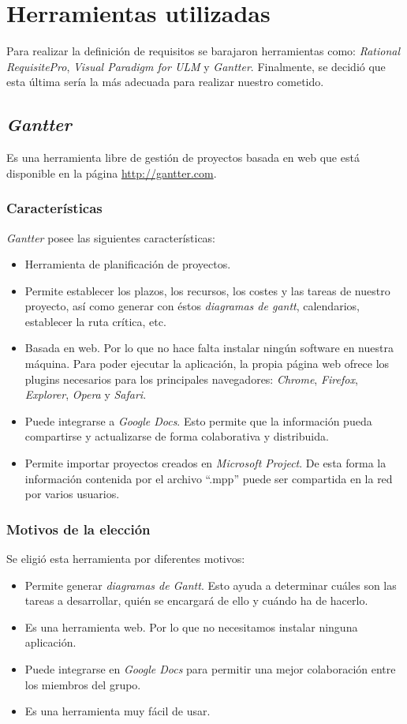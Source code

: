 \section{Herramientas utilizadas}
Para realizar la definición de requisitos se barajaron herramientas como:
\emph{Rational RequisitePro}, \emph{Visual Paradigm for ULM} y \emph{Gantter}.
Finalmente, se decidió que esta última sería la más adecuada para realizar
nuestro cometido.

\subsection{\emph{Gantter}}
Es una herramienta libre de gestión de proyectos basada en web que está
disponible en la página \url{http://gantter.com}.

\subsubsection{Características}
\emph{Gantter} posee las siguientes características:
\begin{itemize}
\item Herramienta de planificación de proyectos.
\item Permite establecer los plazos, los recursos, los costes y las tareas de
nuestro proyecto, así como generar con éstos \emph{diagramas de gantt}, 
calendarios, establecer la ruta crítica, etc.
\item Basada en web. Por lo que no hace falta instalar ningún software en
nuestra máquina. Para poder ejecutar la aplicación, la propia página web
ofrece los plugins necesarios para los principales navegadores: \emph{Chrome},
\emph{Firefox}, \emph{Explorer}, \emph{Opera} y \emph{Safari}.
\item Puede integrarse a \emph{Google Docs}. Esto permite que la información
pueda compartirse y actualizarse de forma colaborativa y distribuida.
\item Permite importar proyectos creados en \emph{Microsoft Project}. De esta
forma la información contenida por el archivo ``.mpp'' puede ser compartida en
la red por varios usuarios.
\end{itemize}

\subsubsection{Motivos de la elección}
Se eligió esta herramienta por diferentes motivos:
\begin{itemize}
\item Permite generar \emph{diagramas de Gantt}. Esto ayuda a determinar
cuáles son las tareas a desarrollar, quién se encargará de ello y cuándo ha de
hacerlo.
\item Es una herramienta web. Por lo que no necesitamos instalar ninguna
aplicación.
\item Puede integrarse en \emph{Google Docs} para permitir una mejor
colaboración entre los miembros del grupo.
\item Es una herramienta muy fácil de usar.
\end{itemize}

